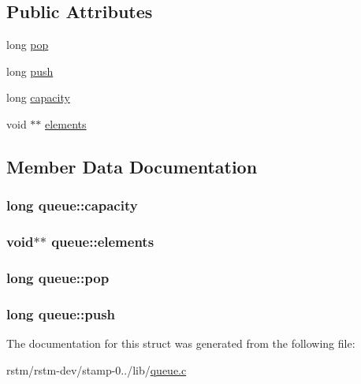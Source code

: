 \subsection*{Public Attributes}
\begin{DoxyCompactItemize}
\item 
long \hyperlink{structqueue_aaf4d0943622e884d75cae9ba4a44106b}{pop}
\item 
long \hyperlink{structqueue_a402c61d763220858e7418ac12d9171eb}{push}
\item 
long \hyperlink{structqueue_ac910209af4a68bb9ce7eea28f26ae4f7}{capacity}
\item 
void $\ast$$\ast$ \hyperlink{structqueue_a4a2cdfbe9ab5ae93457d69c10f537e93}{elements}
\end{DoxyCompactItemize}


\subsection{Member Data Documentation}
\hypertarget{structqueue_ac910209af4a68bb9ce7eea28f26ae4f7}{
\subsubsection[{capacity}]{\setlength{\rightskip}{0pt plus 5cm}long queue\-::capacity}}\label{structqueue_ac910209af4a68bb9ce7eea28f26ae4f7}
\hypertarget{structqueue_a4a2cdfbe9ab5ae93457d69c10f537e93}{
\subsubsection[{elements}]{\setlength{\rightskip}{0pt plus 5cm}void$\ast$$\ast$ queue\-::elements}}\label{structqueue_a4a2cdfbe9ab5ae93457d69c10f537e93}
\hypertarget{structqueue_aaf4d0943622e884d75cae9ba4a44106b}{
\subsubsection[{pop}]{\setlength{\rightskip}{0pt plus 5cm}long queue\-::pop}}\label{structqueue_aaf4d0943622e884d75cae9ba4a44106b}
\hypertarget{structqueue_a402c61d763220858e7418ac12d9171eb}{
\subsubsection[{push}]{\setlength{\rightskip}{0pt plus 5cm}long queue\-::push}}\label{structqueue_a402c61d763220858e7418ac12d9171eb}


The documentation for this struct was generated from the following file\-:\begin{DoxyCompactItemize}
\item 
rstm/rstm-\/dev/stamp-\/0../lib/\hyperlink{queue_8c}{queue.\-c}\end{DoxyCompactItemize}
